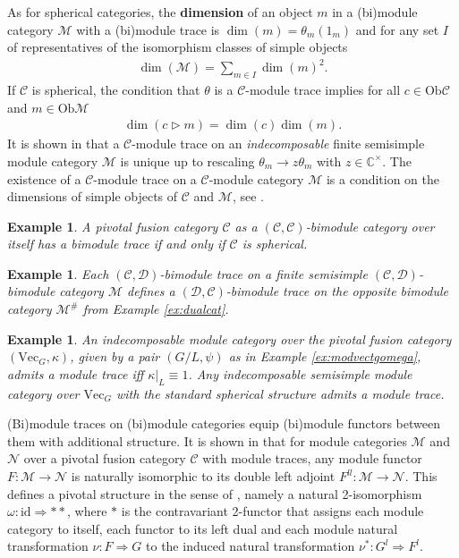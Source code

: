 \documentclass[1.5pt, a4paper]{article}
\newcommand{\C}{\mathbb{C}}
\newcommand{\mac}{\mathcal C}
\newcommand{\mad}{\mathcal D}
\newcommand{\mam}{\mathcal M}
\newcommand{\man}{\mathcal N}
\newcommand{\Ob}{\mathrm{Ob}}
\newcommand{\id}[0]{\mathrm{id}}
\newtheorem{example}[theorem]{Example}
\begin{document}
As for spherical categories,  the {\bf dimension} of an object $m$ in a (bi)module category $\mam$ with a (bi)module trace is $\dim(m)=\theta_m(1_m)$ and  for any set $I$ of representatives of the isomorphism classes of simple objects 
\begin{align}
\dim(\mam)=\sum_{m\in I} \dim(m)^2.
\end{align}
If $\mathcal C$ is spherical, the condition that $\theta$ is a $\mac$-module trace  implies for all $c\in \Ob\mac$  and $m\in\Ob\mam$
\begin{align}\label{eq:dimensionsmodule}
\dim(c\rhd m)=\dim(c)\dim(m).
\end{align}
It is shown in \cite[Prop.~4.4]{G12} that a $\mac$-module trace on an {\em indecomposable} finite semisimple module category $\mam$ is unique up to rescaling $\theta_m\to z\theta_m$ with $z\in\C^\times$. The existence of a $\mac$-module trace on a $\mac$-module category $\mam$ is a condition on  the dimensions of simple objects of $\mac$ and $\mam$, see \cite[Sec.~5]{G12}.

\begin{example} \label{ex:sphtriv}
 A pivotal fusion category $\mac$ as a $(\mac,\mac)$-bimodule category over itself has a bimodule trace if and only if $\mac$ is spherical. 
\end{example}

\begin{example}\label{ex:opptrace}
Each  $(\mac,\mad)$-bimodule trace on a finite semisimple $(\mac,\mad)$-bimodule category $\mam$ defines a $(\mad,\mac)$-bimodule trace on the opposite bimodule category $\mam^\#$ from Example \ref{ex:dualcat}.
\end{example}

\begin{example}\cite[Ex.~3.13]{G12} \label{ex:tracevect}An indecomposable module category over the pivotal fusion category $(\mathrm{Vec}_G, \kappa)$,  given by a pair $(G/L,\psi)$ as in Example \ref{ex:modvectgomega}, admits a module trace iff $\kappa\vert_{L}\equiv 1$.
Any indecomposable semisimple module category over $\mathrm{Vec}_G$ with the standard spherical structure admits a module trace.
\end{example}




(Bi)module traces on (bi)module categories equip (bi)module functors between them with additional structure. It is shown in \cite[Th.~4.5]{G12}  that for module categories $\mam$ and $\man$  over a pivotal fusion category $\mac$  with  module traces, any module functor $F:\mam\to\man$ is naturally isomorphic to its double left adjoint $F^{ll}: \mam\to\man$. This  defines a pivotal structure in the sense of \cite[Def.~A.12]{G14}, namely  a natural 2-isomorphism $\omega: \id\Rightarrow **$, where $*$ is the contravariant 2-functor that assigns each module category to itself,  each functor to its left dual and each module natural transformation $\nu: F\Rightarrow G$ to the induced natural transformation $\nu^*: G^l\Rightarrow F^l$. 
\end{document}
